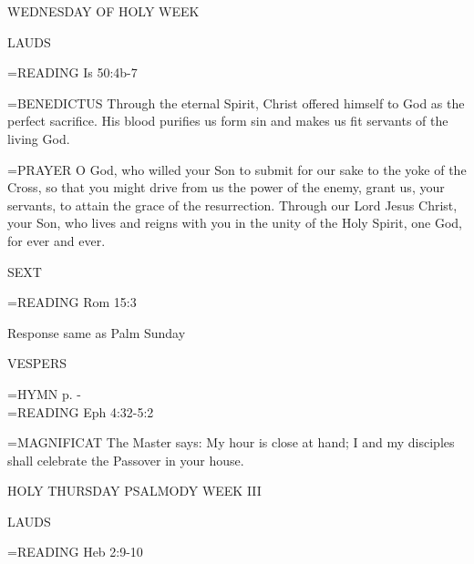 WEDNESDAY OF HOLY WEEK

\begin{flushleft}\normalsize LAUDS\\\end{flushleft}
\hangindent=\parindent \small{\uppercase{READING}}    Is 50:4b-7 \textbf{   \\}

\hangindent=\parindent \small{BENEDICTUS 	Through the eternal Spirit, Christ offered himself to God as the perfect sacrifice. His blood purifies us form sin and makes us fit servants of the living God.\\}

\hangindent=\parindent \small{PRAYER 	O God, who willed your Son to submit for our sake to the yoke of the Cross, so that you might drive from us the power of the enemy, grant us, your servants, to attain the grace of the resurrection. Through our Lord Jesus Christ, your Son, who lives and reigns with you in the unity of the Holy Spirit, one God, for ever and ever.}

\begin{flushleft}\normalsize SEXT\\\end{flushleft}
\hangindent=\parindent \small{\uppercase{READING}}    Rom 15:3 \textbf{   \\}

Response same as Palm Sunday

\begin{flushleft}\normalsize VESPERS\\\end{flushleft}
\hangindent=\parindent \small{\uppercase{HYMN} p. \pageref{lent:firstHymn}-\pageref{lent:lastHymn}\\}
\hangindent=\parindent \small{\uppercase{READING}}    Eph 4:32-5:2 \textbf{   \\}

\hangindent=\parindent \small{MAGNIFICAT 	The Master says: My hour is close at hand; I and my disciples shall celebrate the Passover in your house.\\}

HOLY THURSDAY
PSALMODY WEEK III

\begin{flushleft}\normalsize LAUDS\\\end{flushleft}
\hangindent=\parindent \small{\uppercase{READING}}    Heb 2:9-10 \textbf{   \\}

